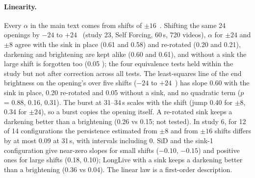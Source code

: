 \paragraph{Linearity.} Every $\alpha$ in the main text comes from shifts of $\pm16$~\Lstar. Shifting the same 24
openings by $-24$ to $+24$~\Lstar{} (study 23, Self Forcing, 60\,s, 720 videos), $\alpha$ for $\pm24$ and $\pm8$ agree
with the sink in place (0.61 and 0.58) and re-rotated (0.20 and 0.21), darkening and brightening are kept alike (0.60
and 0.61), and without a sink the large shift is forgotten too (0.05 ); the four equivalence tests held
within the study but not after correction across all tests. The least-squares line of the end brightness on the opening's over five shifts
($-24$ to $+24$~\Lstar) has slope 0.60  with the sink in place, 0.20  re-rotated and 0.05
 without a sink, and no quadratic term ($p$ = 0.88, 0.16, 0.31). The burst at 31--34\,s scales with the
shift (jump 0.40 for $\pm8$, 0.34 for $\pm24$), so a burst copies the opening itself. A re-rotated sink keeps a darkening
better than a brightening (0.26 vs 0.15; not tested). In study 6, for 12 of 14 configurations the persistence estimated
from $\pm8$ and from $\pm16$ shifts differs by at most 0.09 at 31\,s, with intervals including 0. SiD and the sink-1 configuration give near-zero slopes for small shifts
($-0.10$, $-0.15$) and positive ones for large shifts (0.18, 0.10); LongLive with a sink keeps a darkening better than
a brightening (0.36 vs 0.04). The linear law is a first-order description.


